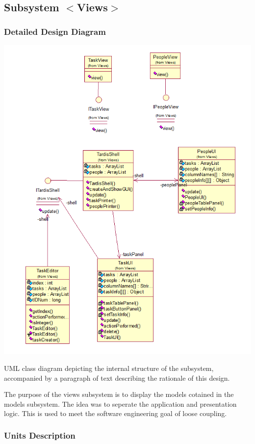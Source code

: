 \subsection{Subsystem $<$Views$>$}

\subsubsection{Detailed Design Diagram}
\includegraphics{subsystems/diagrams/views_class_diagram.png}

UML class diagram depicting the internal structure of the subsystem,
accompanied by a paragraph of text describing the rationale of this design.

The purpose of the views subsystem is to display the models cotained in the models subsystem. The idea was to seperate the application and presentation logic. This is used to meet the software engineering goal of loose coupling.

\subsubsection{Units Description}

